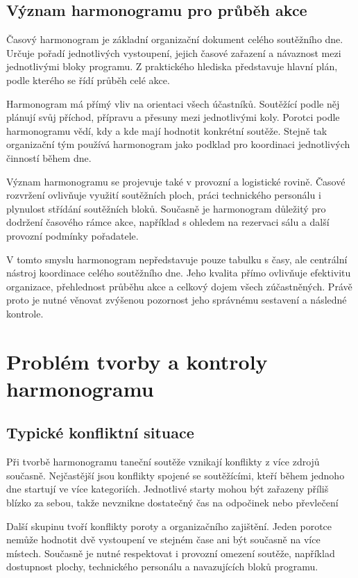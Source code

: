 \documentclass[czech, kiv, ba, he, iso690alph, pdf]{fasthesis}
\begin{document}
			\subsection{Význam harmonogramu pro průběh akce}
			
				Časový harmonogram je základní organizační dokument celého soutěžního dne. Určuje pořadí jednotlivých vystoupení, jejich časové zařazení a návaznost mezi jednotlivými bloky programu. Z praktického hlediska představuje hlavní plán, podle kterého se řídí průběh celé akce.
	
				Harmonogram má přímý vliv na orientaci všech účastníků. Soutěžící podle něj plánují svůj příchod, přípravu a přesuny mezi jednotlivými koly. Porotci podle harmonogramu vědí, kdy a kde mají hodnotit konkrétní soutěže. Stejně tak organizační tým používá harmonogram jako podklad pro koordinaci jednotlivých činností během dne.
	
				Význam harmonogramu se projevuje také v provozní a logistické rovině. Časové rozvržení ovlivňuje využití soutěžních ploch, práci technického personálu i plynulost střídání soutěžních bloků. Současně je harmonogram důležitý pro dodržení časového rámce akce, například s ohledem na rezervaci sálu a další provozní podmínky pořadatele.
	
				V tomto smyslu harmonogram nepředstavuje pouze tabulku s časy, ale centrální nástroj koordinace celého soutěžního dne. Jeho kvalita přímo ovlivňuje efektivitu organizace, přehlednost průběhu akce a celkový dojem všech zúčastněných. Právě proto je nutné věnovat zvýšenou pozornost jeho správnému sestavení a následné kontrole.

		\section{Problém tvorby a kontroly harmonogramu}
	
			\subsection{Typické konfliktní situace}
	
				Při tvorbě harmonogramu taneční soutěže vznikají konflikty z více zdrojů současně. Nejčastější jsou konflikty spojené se soutěžícími, kteří během jednoho dne startují ve více kategoriích. Jednotlivé starty mohou být zařazeny příliš blízko za sebou, takže nevznikne dostatečný čas na odpočinek nebo převlečení
	
				Další skupinu tvoří konflikty poroty a organizačního zajištění. Jeden porotce nemůže hodnotit dvě vystoupení ve stejném čase ani být současně na více místech. Současně je nutné respektovat i provozní omezení soutěže, například dostupnost plochy, technického personálu a navazujících bloků programu.
	
\end{document}
